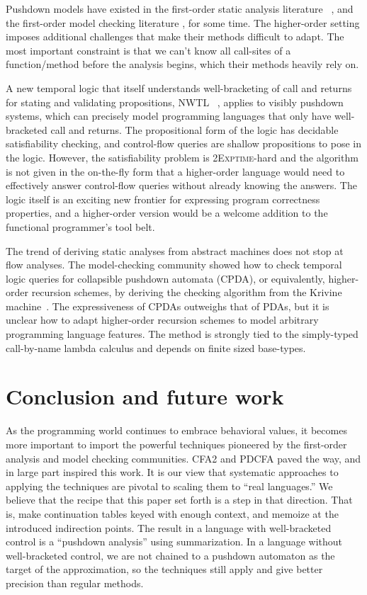 Pushdown models have existed in the first-order static analysis literature ~\citep[Chapter 7]{local:muchnick:jones:flow-analysis:1981}\citep{ianjohnson:reps:pushdown:1995}, and the first-order model checking literature \citep{ianjohnson:bouajiani:esparza:pushdown:1997}, for some time.
%
The higher-order setting imposes additional challenges that make their methods difficult to adapt.
%
The most important constraint is that we can't know all call-sites of a function/method before the analysis begins, which their methods heavily rely on.

A new temporal logic that itself understands well-bracketing of call and returns for stating and validating propositions, NWTL ~\citep{ianjohnson:alur:nwtl:2007}, applies to visibly pushdown systems, which can precisely model programming languages that only have well-bracketed call and returns.
%
The propositional form of the logic has decidable satisfiability checking, and control-flow queries are shallow propositions to pose in the logic.
%
However, the satisfiability problem is \textsc{2Exptime}-hard and the algorithm is not given in the on-the-fly form that a higher-order language would need to effectively answer control-flow queries without already knowing the answers.
%
The logic itself is an exciting new frontier for expressing program correctness properties, and a higher-order version would be a welcome addition to the functional programmer's tool belt.

The trend of deriving static analyses from abstract machines does not stop at flow analyses.
%
The model-checking community showed how to check temporal logic queries for collapsible pushdown automata (CPDA), or equivalently, higher-order recursion schemes, by deriving the checking algorithm from the Krivine machine~\citep{ianjohnson:Salvati:2011:KMH:2027223.027239}.
%
The expressiveness of CPDAs outweighs that of PDAs, but it is unclear how to adapt higher-order recursion schemes to model arbitrary programming language features.
%
The method is strongly tied to the simply-typed call-by-name lambda calculus and depends on finite sized base-types.

\section{Conclusion and future work}

As the programming world continues to embrace behavioral values, it becomes more important to import the powerful techniques pioneered by the first-order analysis and model checking communities.
%
CFA2 and PDCFA paved the way, and in large part inspired this work.
%
It is our view that systematic approaches to applying the techniques are pivotal to scaling them to ``real languages.''
%
We believe that the recipe that this paper set forth is a step in that direction.
%
That is, make continuation tables keyed with enough context, and memoize at the introduced indirection points.
%
The result in a language with well-bracketed control is a ``pushdown analysis'' using summarization.
%
In a language without well-bracketed control, we are not chained to a pushdown automaton as the target of the approximation, so the techniques still apply and give better precision than regular methods.

